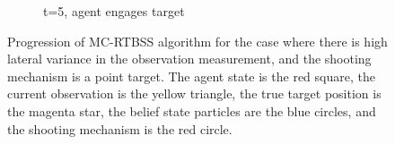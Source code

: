 \begin{figure}
\begin{subfigure}[b]{0.3\textwidth}
                \caption{t=5, agent engages target}
                \label{fig:bad_heading_t_5}
        \end{subfigure}
        \caption{Progression of MC-RTBSS algorithm for the case where there is high lateral variance in the observation measurement, and the shooting mechanism is a point target. The agent state is the red square, the current observation is the yellow triangle, the true target position is the magenta star, the belief state particles are the blue circles, and the shooting mechanism is the red circle.}\label{fig:bad_heading}
\end{figure}